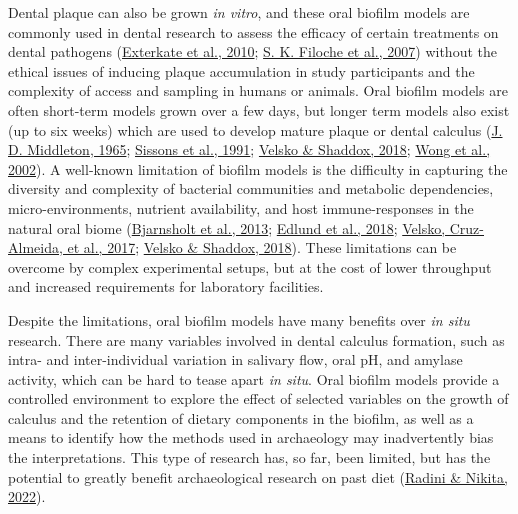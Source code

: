 \documentclass[
  letterpaper,
]{book}
\begin{document}
Dental plaque can also be grown \emph{in vitro}, and these oral biofilm
models are commonly used in dental research to assess the efficacy of
certain treatments on dental pathogens
(\protect\hyperlink{ref-extercateAAA2010}{Exterkate et al., 2010};
\protect\hyperlink{ref-filochePlaqueMicrocosm2007}{S. K. Filoche et al.,
2007}) without the ethical issues of inducing plaque accumulation in
study participants and the complexity of access and sampling in humans
or animals. Oral biofilm models are often short-term models grown over a
few days, but longer term models also exist (up to six weeks) which are
used to develop mature plaque or dental calculus
(\protect\hyperlink{ref-middletonVitroCalculus1965}{J. D. Middleton,
1965}; \protect\hyperlink{ref-sissonsMultistationPlaque1991}{Sissons et
al., 1991};
\protect\hyperlink{ref-velskoConsistentReproducible2018}{Velsko \&
Shaddox, 2018}; \protect\hyperlink{ref-wongCalciumPhosphate2002}{Wong et
al., 2002}). A well-known limitation of biofilm models is the difficulty
in capturing the diversity and complexity of bacterial communities and
metabolic dependencies, micro-environments, nutrient availability, and
host immune-responses in the natural oral biome
(\protect\hyperlink{ref-bjarnsholtVivoBiofilm2013}{Bjarnsholt et al.,
2013}; \protect\hyperlink{ref-edlundUncoveringComplex2018}{Edlund et
al., 2018}; \protect\hyperlink{ref-velskoCytokineResponse2017}{Velsko,
Cruz-Almeida, et al., 2017};
\protect\hyperlink{ref-velskoConsistentReproducible2018}{Velsko \&
Shaddox, 2018}). These limitations can be overcome by complex
experimental setups, but at the cost of lower throughput and increased
requirements for laboratory facilities.

Despite the limitations, oral biofilm models have many benefits over
\emph{in situ} research. There are many variables involved in dental
calculus formation, such as intra- and inter-individual variation in
salivary flow, oral pH, and amylase activity, which can be hard to tease
apart \emph{in situ}. Oral biofilm models provide a controlled
environment to explore the effect of selected variables on the growth of
calculus and the retention of dietary components in the biofilm, as well
as a means to identify how the methods used in archaeology may
inadvertently bias the interpretations. This type of research has, so
far, been limited, but has the potential to greatly benefit
archaeological research on past diet
(\protect\hyperlink{ref-radiniDirtyTeeth2022}{Radini \& Nikita, 2022}).
\end{document}
